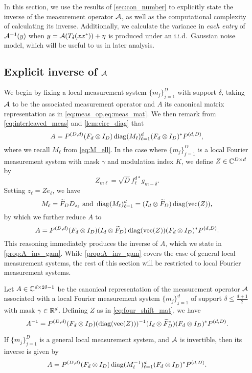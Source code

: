 In this section, we use the results of \cref{sec:con_number} to explicitly state the inverse of the measurement operator $\mathcal{A}$, as well as the computational complexity of calculating its inverse.  Additionally, we calculate the variance in \emph{each entry} of $\mathcal{A}^{-1}(y)$ when $y = \mathcal{A}(T_\delta(x x^*)) + \eta$ is produced under an i.i.d.~Gaussian noise model, which will be useful to us in later analysis.

\subsection{Explicit inverse of $\mathcal{A}$}
\label{sec:inv_runtime}

We begin by fixing a local measurement system $\{m_j\}_{j = 1}^D$ with support $\delta$, taking $\mathcal{A}$ to be the associated measurement operator and $A$ its canonical matrix representation as in \cref{eq:meas_op,eq:meas_mat}.  We then remark from \eqref{eq:interleaved_meas} and \cref{lem:circ_diag} that \[A = P^{(D, d)} (F_d \otimes I_D) \operatorname{diag}(M_\ell)_{\ell = 1}^d (F_d \otimes I_D)^* P^{(d, D)},\]  where we recall $M_\ell$ from \eqref{eq:M_ell}.  In the case where $\{m_j\}_{j = 1}^D$ is a local Fourier measurement system with mask $\gamma$ and modulation index $K$, we define $Z \in \mathbb{C}^{D \times d}$ by \begin{equation} Z_{m \ell} = \sqrt{D} f_\ell^{d*} g_{m - \delta}. \label{eq:four_shift_mat}\end{equation}  Setting $z_\ell = Z e_\ell$, we have \begin{equation} M_\ell = \tF_D D_{z_\ell} \ \text{and} \ \diag(M_\ell)_{\ell = 1}^d = (I_d \otimes \tF_D) \diag(\vec(Z)), \label{eq:M_rearr} \end{equation} by which we further reduce $A$ to \[A = P^{(D, d)} (F_d \otimes I_D) (I_d \otimes \widetilde{F}_D) \operatorname{diag}(\operatorname{vec}(Z)) (F_d \otimes I_D)^* P^{(d, D)}.\]  This reasoning immediately produces the inverse of $A$, which we state in \cref{prop:A_inv_gam}.  While \cref{prop:A_inv_gam} covers the case of general local measurement systems, the rest of this section will be restricted to local Fourier measurement systems.

\begin{proposition}
  Let $A \in \mathbb{C}^{d \times 2 \delta - 1}$ be the canonical representation of the measurement operator $\mathcal{A}$ associated with a local Fourier measurement system $\{m_j\}_{j = 1}^d$ of support $\delta \le \frac{d + 1}{2}$ with mask $\gamma \in \mathbb{R}^d$.  Defining $Z$ as in \eqref{eq:four_shift_mat}, we have
  \begin{equation} A^{-1} = P^{(D, d)} (F_d \otimes I_D) (\operatorname{diag}(\operatorname{vec}(Z)))^{-1} (I_d \otimes \widetilde{F}_D^*) (F_d \otimes I_D)^* P^{(d, D)}. \label{eq:A_inv_gam} \end{equation}

  If $\{m_j\}_{j = 1}^D$ is a general local measurement system, and $\mathcal{A}$ is invertible, then its inverse is given by \[A = P^{(D, d)} (F_d \otimes I_D) \operatorname{diag}(M_\ell^{-1})_{\ell = 1}^d (F_d \otimes I_D)^* P^{(d, D)}.\]
  \label{prop:A_inv_gam}
\end{proposition}

